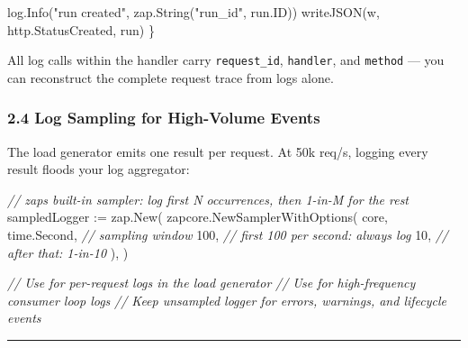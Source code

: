 \documentclass[
]{article}
\newenvironment{Shaded}{}{}
\newcommand{\CommentTok}[1]{\textcolor[rgb]{0.38,0.63,0.69}{\textit{#1}}}
\newcommand{\DecValTok}[1]{\textcolor[rgb]{0.25,0.63,0.44}{#1}}
\newcommand{\NormalTok}[1]{#1}
\newcommand{\OperatorTok}[1]{\textcolor[rgb]{0.40,0.40,0.40}{#1}}
\newcommand{\StringTok}[1]{\textcolor[rgb]{0.25,0.44,0.63}{#1}}
\begin{document}
\begin{Shaded}
\begin{Highlighting}[]
\NormalTok{    log}\OperatorTok{.}\NormalTok{Info}\OperatorTok{(}\StringTok{"run created"}\OperatorTok{,}\NormalTok{ zap}\OperatorTok{.}\NormalTok{String}\OperatorTok{(}\StringTok{"run\_id"}\OperatorTok{,}\NormalTok{ run}\OperatorTok{.}\NormalTok{ID}\OperatorTok{))}
\NormalTok{    writeJSON}\OperatorTok{(}\NormalTok{w}\OperatorTok{,}\NormalTok{ http}\OperatorTok{.}\NormalTok{StatusCreated}\OperatorTok{,}\NormalTok{ run}\OperatorTok{)}
\OperatorTok{\}}
\end{Highlighting}
\end{Shaded}

All log calls within the handler carry \texttt{request\_id},
\texttt{handler}, and \texttt{method} --- you can reconstruct the
complete request trace from logs alone.

\hypertarget{log-sampling-for-high-volume-events}{%
\subsubsection{2.4 Log Sampling for High-Volume
Events}\label{log-sampling-for-high-volume-events}}

The load generator emits one result per request. At 50k req/s, logging
every result floods your log aggregator:

\begin{Shaded}
\begin{Highlighting}[]
\CommentTok{// zap\textquotesingle{}s built{-}in sampler: log first N occurrences, then 1{-}in{-}M for the rest}
\NormalTok{sampledLogger }\OperatorTok{:=}\NormalTok{ zap}\OperatorTok{.}\NormalTok{New}\OperatorTok{(}
\NormalTok{    zapcore}\OperatorTok{.}\NormalTok{NewSamplerWithOptions}\OperatorTok{(}
\NormalTok{        core}\OperatorTok{,}
\NormalTok{        time}\OperatorTok{.}\NormalTok{Second}\OperatorTok{,}   \CommentTok{// sampling window}
        \DecValTok{100}\OperatorTok{,}           \CommentTok{// first 100 per second: always log}
        \DecValTok{10}\OperatorTok{,}            \CommentTok{// after that: 1{-}in{-}10}
    \OperatorTok{),}
\OperatorTok{)}

\CommentTok{// Use for per{-}request logs in the load generator}
\CommentTok{// Use for high{-}frequency consumer loop logs}
\CommentTok{// Keep unsampled logger for errors, warnings, and lifecycle events}
\end{Highlighting}
\end{Shaded}

\begin{center}\rule{0.5\linewidth}{0.5pt}\end{center}
\end{document}
